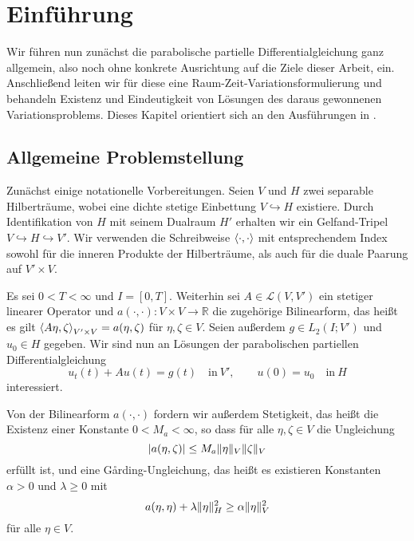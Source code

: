
\chapter{Einführung} %
\label{cha:einfuehrung}

Wir führen nun zunächst die parabolische partielle Differentialgleichung ganz allgemein, also noch ohne konkrete Ausrichtung auf die Ziele dieser Arbeit, ein.
Anschließend leiten wir für diese eine Raum-Zeit-Variationsformulierung und behandeln Existenz und Eindeutigkeit von Lösungen des daraus gewonnenen Variationsproblems.
Dieses Kapitel orientiert sich an den Ausführungen in \cite{Schwab:2009ec, Urban:2014kg}.

\section{Allgemeine Problemstellung} %
\label{sec:allgemeine_problemstellung}

Zunächst einige notationelle Vorbereitungen.
Seien $V$ und $H$ zwei separable Hilberträume, wobei eine dichte stetige Einbettung $V \hookrightarrow H$ existiere.
Durch Identifikation von $H$ mit seinem Dualraum $H'$ erhalten wir ein Gelfand-Tripel $V \hookrightarrow H \hookrightarrow V'$.
Wir verwenden die Schreibweise $\left\langle\cdot,\cdot\right\rangle$ mit entsprechendem Index sowohl für die inneren Produkte der Hilberträume, als auch für die duale Paarung auf $V' \times V$.

Es sei $0 < T < \infty$ und $I = [0, T]$.
Weiterhin sei $A \in \mathcal L(V, V')$ ein stetiger linearer Operator und $a(\cdot, \cdot) \colon V \times V \to \mathbb{R}$ die zugehörige Bilinearform, das heißt es gilt $\left\langle A \eta,\zeta\right\rangle_{V' \times V} = a(\eta, \zeta)$ für $\eta, \zeta \in V$.
Seien außerdem $g \in L_{2}(I; V')$ und $u_{0} \in H$ gegeben.
Wir sind nun an Lösungen der parabolischen partiellen Differentialgleichung
\begin{equation}
    \label{eq:allgemeine_parabolische_pde}
    u_{t}(t) + A u(t) = g(t) \quad \text{in}~V',
    \qquad
    u(0) = u_{0} \quad \text{in}~H
\end{equation}
interessiert.

Von der Bilinearform $a(\cdot, \cdot)$ fordern wir außerdem Stetigkeit, das heißt die Existenz einer Konstante $0 < M_{a} < \infty$, so dass für alle $\eta, \zeta \in V$ die Ungleichung
\begin{equation}
    \label{eq:allgemeine_parabolische_pde:bf_stetig}
    \lvert a(\eta, \zeta)\rvert \leq M_{a} \lVert\eta\rVert_{V} \lVert\zeta\rVert_{V}
\end{equation}
erfüllt ist, und eine G\aa rding-Ungleichung, das heißt es existieren Konstanten $\alpha > 0$ und $\lambda \geq 0$ mit
\begin{equation}
    \label{eq:allgemeine_parabolische_pde:bf_garding}
    a(\eta, \eta) + \lambda \lVert\eta\rVert_{H}^{2} \geq \alpha \lVert\eta\rVert_{V}^{2}
\end{equation}
für alle $\eta \in V$.

